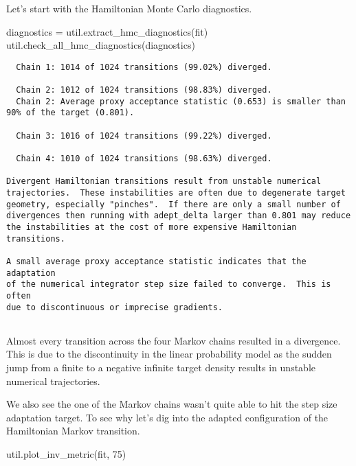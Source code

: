 \documentclass[
  letterpaper,
  DIV=11,
  numbers=noendperiod]{scrartcl}
\newenvironment{Shaded}{\begin{snugshade}}{\end{snugshade}}
\newcommand{\DecValTok}[1]{\textcolor[rgb]{0.68,0.00,0.00}{#1}}
\newcommand{\NormalTok}[1]{\textcolor[rgb]{0.00,0.23,0.31}{#1}}
\newcommand{\OperatorTok}[1]{\textcolor[rgb]{0.37,0.37,0.37}{#1}}
\begin{document}
Let's start with the Hamiltonian Monte Carlo diagnostics.

\begin{Shaded}
\begin{Highlighting}[]
\NormalTok{diagnostics }\OperatorTok{=}\NormalTok{ util.extract\_hmc\_diagnostics(fit)}
\NormalTok{util.check\_all\_hmc\_diagnostics(diagnostics)}
\end{Highlighting}
\end{Shaded}

\begin{verbatim}
  Chain 1: 1014 of 1024 transitions (99.02%) diverged.
 
  Chain 2: 1012 of 1024 transitions (98.83%) diverged.
  Chain 2: Average proxy acceptance statistic (0.653) is smaller than
90% of the target (0.801).
 
  Chain 3: 1016 of 1024 transitions (99.22%) diverged.
 
  Chain 4: 1010 of 1024 transitions (98.63%) diverged.
 
Divergent Hamiltonian transitions result from unstable numerical
trajectories.  These instabilities are often due to degenerate target
geometry, especially "pinches".  If there are only a small number of
divergences then running with adept_delta larger than 0.801 may reduce
the instabilities at the cost of more expensive Hamiltonian transitions.
 
A small average proxy acceptance statistic indicates that the adaptation
of the numerical integrator step size failed to converge.  This is often
due to discontinuous or imprecise gradients.
 
\end{verbatim}

Almost every transition across the four Markov chains resulted in a
divergence. This is due to the discontinuity in the linear probability
model as the sudden jump from a finite to a negative infinite target
density results in unstable numerical trajectories.

We also see the one of the Markov chains wasn't quite able to hit the
step size adaptation target. To see why let's dig into the adapted
configuration of the Hamiltonian Markov transition.

\begin{Shaded}
\begin{Highlighting}[]
\NormalTok{util.plot\_inv\_metric(fit, }\DecValTok{75}\NormalTok{)}
\end{Highlighting}
\end{Shaded}
\end{document}
